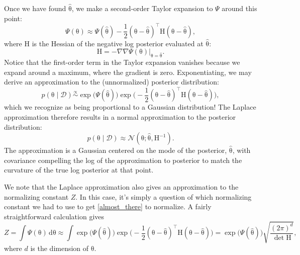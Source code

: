 \documentclass{article}
\newcommand{\given}{\mid}
\newcommand{\mc}[1]{\mathcal{#1}}
\newcommand{\data}{\mc{D}}
\newcommand{\intd}[1]{\,\mathrm{d}{#1}}
\newcommand{\inv}{^{-1}}
\newcommand{\trans}{^\top}
\newcommand{\mat}[1]{\bm{\mathrm{#1}}}
\renewcommand{\vec}[1]{\bm{\mathrm{#1}}}
\begin{document}
Once we have found $\hat{\vec{\theta}}$, we make a second-order Taylor
expansion to $\Psi$ around this point:
\begin{equation*}
  \Psi(\vec{\theta})
  \approx
  \Psi(\hat{\vec{\theta}})
  -
  \frac{1}{2}
  (\vec{\theta} - \hat{\vec{\theta}})\trans
  \mat{H}
  (\vec{\theta} - \hat{\vec{\theta}}),
\end{equation*}
where $\mat{H}$ is the Hessian of the negative log posterior evaluated
at $\hat{\vec{\theta}}$:
\begin{equation*}
  \mat{H}
  =
  -\nabla\nabla \Psi(\vec{\theta}) \bigr\rvert_{\vec{\theta} = \hat{\vec{\theta}}}.
\end{equation*}
Notice that the first-order term in the Taylor expansion vanishes
because we expand around a maximum, where the gradient is zero.
Exponentiating, we may derive an approximation to the (unnormalized)
posterior distribution:
\begin{equation}
  \label{almost_there}
  p(\vec{\theta} \given \data)
  \overset{\propto}{\sim}
  \exp\bigl(\Psi(\hat{\vec{\theta}})\bigr)
  \exp\biggl(-\frac{1}{2}
  (\vec{\theta} - \hat{\vec{\theta}})\trans
  \mat{H}
  (\vec{\theta} - \hat{\vec{\theta}})
  \biggr),
\end{equation}
which we recognize as being proportional to a Gaussian distribution!
The Laplace approximation therefore results in a normal approximation
to the posterior distribution:
\begin{equation*}
  p(\vec{\theta} \given \data)
  \approx
  \mc{N}(\vec{\theta}; \hat{\vec{\theta}}, \mat{H}\inv).
\end{equation*}
The approximation is a Gaussian centered on the mode of the posterior,
$\hat{\vec{\theta}}$, with covariance compelling the log of the
approximation to posterior to match the curvature of the true log
posterior at that point.

We note that the Laplace approximation also gives an approximation to
the normalizing constant $Z$.  In this case, it's simply a question of
which normalizing constant we had to use to get \eqref{almost_there}
to normalize.  A fairly straightforward calculation gives
\begin{equation*}
  Z
  =
  \int \Psi(\vec{\theta}) \intd{\vec{\theta}}
  \approx
  \int
  \exp\bigl(\Psi(\hat{\vec{\theta}})\bigr)
  \exp\biggl(-\frac{1}{2}
  (\vec{\theta} - \hat{\vec{\theta}})\trans
  \mat{H}
  (\vec{\theta} - \hat{\vec{\theta}})
  \biggr)
  =
  \exp\bigl(\Psi(\hat{\vec{\theta}})\bigr)
  \sqrt{
    \frac{(2\pi)^d}
         {\det \mat{H}}
   },
\end{equation*}
where $d$ is the dimension of $\vec{\theta}$.
\end{document}

